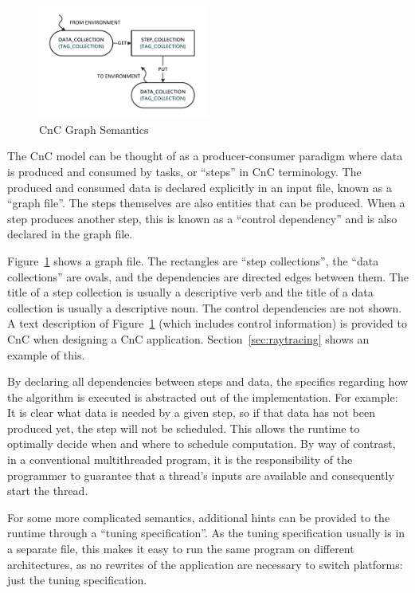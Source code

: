 \begin{figure}[t!]
  \centering
  \includegraphics[width=0.5\textwidth]{drawings/CnCExample.pdf}
  \caption{CnC Graph Semantics}
  \label{fig:cnc_graph}
\end{figure}

The CnC model can be thought of as a producer-consumer paradigm where
data is produced and consumed by tasks, or ``steps'' in CnC
terminology. The produced and consumed data is declared explicitly in
an input file, known as a ``graph file''. The steps themselves are
also entities that can be produced. When a step produces another step,
this is known as a ``control dependency'' and is also declared in the
graph file.

Figure~\ref{fig:cnc_graph} shows a graph file. The rectangles are
``step collections'', the ``data collections'' are ovals, and the
dependencies are directed edges between them. The title of a step
collection is usually a descriptive verb and the title of a data
collection is usually a descriptive noun. The control dependencies are
not shown. A text description of Figure~\ref{fig:cnc_graph} (which
includes control information) is provided to CnC when designing a CnC
application.
Section~\ref{sec:raytracing} shows an example of this.

By declaring all dependencies between steps and data, the specifics
regarding how the algorithm is executed is abstracted out of the
implementation. For example: It is clear what data is needed by a
given step, so if that data has not been produced yet, the step will
not be scheduled. This allows the runtime to optimally decide when and
where to schedule computation. By way of contrast, in a conventional
multithreaded program, it is the responsibility of the programmer to
guarantee that a thread's inputs are available and consequently start
the thread.

For some more complicated semantics, additional hints can be provided
to the runtime through a ``tuning specification''. As the tuning
specification usually is in a separate file, this makes it easy to run
the same program on different architectures, as no rewrites of the
application are necessary to switch platforms: just the tuning
specification.

